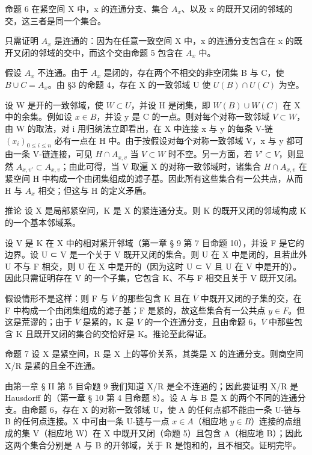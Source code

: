 命题 6 在紧空间 X 中，x 的连通分支、集合 \(A_{x}\)、以及 x 的既开又闭的邻域的交，这三者是同一个集合。

只需证明 \(A_{x}\) 是连通的：因为在任意一致空间 X 中，x 的连通分支包含在 x 的既开又闭的邻域的交中，而这个交由命题 5 包含在 \(A_{x}\) 中。

假设 \(A_{x}\) 不连通。由于 \(A_{x}\) 是闭的，存在两个不相交的非空闭集 B 与 C，使 \(B \cup C = A_{x}\)。由 §3 的命题 4，存在 X 的一致邻域 U 使 \(U(B) \cap U(C)\) 为空。

设 W 是开的一致邻域，使 \(\hat{W} \subset U\)，并设 H 是闭集，即 \(W(B) \cup W(C)\) 在 X 中的余集。例如设 \(x \in B\)，并设 y 是 C 的一点。则对每个对称一致邻域 \(V \subset W\)，由 W 的取法，对 i 用归纳法立即看出，在 X 中连接 x 与 y 的每条 V-链 \((x_{i})_{0 \leqslant i \leqslant n}\) 必有一点在 H 中。由于按假设对每个对称一致邻域 V，x 与 y 都可由一条 V-链连接，可见 \(H \cap A_{x,v}\) 当 \(V \subset W\) 时不空。另一方面，若 \(V' \subset V\)，则显然 \(A_{x,v'} \subset A_{x,v}\)；由此可得，当 V 取遍 X 的对称一致邻域时，诸集合 \(H \cap A_{x,v}\) 在紧空间 H 中构成一个由闭集组成的滤子基。因此所有这些集合有一公共点，从而 H 与 \(A_{x}\) 相交；但这与 H 的定义矛盾。

推论 设 X 是局部紧空间，K 是 X 的紧连通分支。则 K 的既开又闭的邻域构成 K 的一个基本邻域系。

设 V 是 K 在 X 中的相对紧开邻域（第一章 § 9 第 7 目命题 10），并设 F 是它的边界。设 U ⊂ V 是一个关于 V 既开又闭的集合。则 U 在 X 中是闭的，且若此外 U 不与 F 相交，则 U 在 X 中是开的（因为这时 U ⊂ V 且 U 在 V 中是开的）。因此只需证明存在 V 的一个子集，它包含 K、不与 F 相交且关于 V 既开又闭。

假设情形不是这样：则 F 与 \(\overline{V}\) 的那些包含 K 且在 \(\overline{V}\) 中既开又闭的子集的交，在 F 中构成一个由闭集组成的滤子基；F 是紧的，故这些集合有一公共点 \(y \in F\)。但这是荒谬的；由于 \(\overline{V}\) 是紧的，K 是 \(\overline{V}\) 的一个连通分支，且由命题 6，\(\overline{V}\) 中那些包含 K 且既开又闭的集合的交恰好是 K。推论至此得证。

命题 7 设 X 是紧空间，R 是 X 上的等价关系，其类是 X 的连通分支。则商空间 X/R 是紧的且全不连通。

由第一章 § II 第 5 目命题 9 我们知道 X/R 是全不连通的；因此要证明 X/R 是 Hausdorff 的（第一章 § 10 第 4 目命题 8）。设 A 与 B 是 X 的两个不同的连通分支。由命题 6，存在 X 的对称一致邻域 U，使 A 的任何点都不能由一条 U-链与 B 的任何点连接。X 中可由一条 U-链与一点 \(x \in A\)（相应地 \(y \in B\)）连接的点组成的集 V（相应地 W）在 X 中既开又闭（命题 5）且包含 A（相应地 B）；因此这两个集合分别是 A 与 B 的开邻域，关于 R 是饱和的，且不相交。证明完毕。

